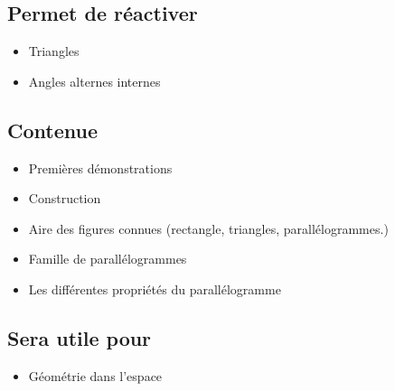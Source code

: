 \subsection{Permet de réactiver}
\begin{itemize}
    \item Triangles
    \item Angles  alternes internes
\end{itemize}

\subsection{Contenue}
\begin{itemize}
    \item Premières démonstrations
    \item Construction
    \item Aire des figures connues (rectangle, triangles, parallélogrammes.)
    \item Famille de parallélogrammes
    \item Les différentes propriétés du parallélogramme
\end{itemize}

\subsection{Sera utile pour}
\begin{itemize}
    \item Géométrie dans l'espace
\end{itemize}